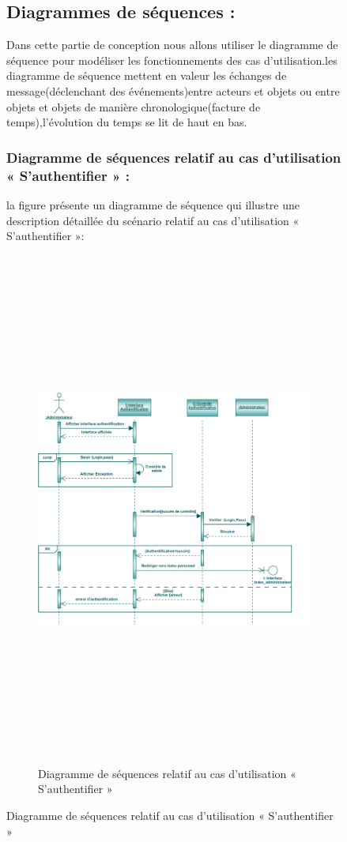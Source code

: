 \documentclass[12 pt]{report}
\begin{document}
\begin{figure}[h]
\begin{center}
\begin{figure}[h]
\begin{center}
\end{center}
\end{figure}



\subsection{Diagrammes de séquences :}
Dans cette partie de conception nous allons utiliser le diagramme de séquence pour modéliser les fonctionnements des cas d'utilisation.les diagramme de séquence mettent en valeur les échanges de message(déclenchant des événements)entre acteurs et objets ou entre objets et objets de manière chronologique(facture de temps),l'évolution du temps se lit de haut en bas.
\newpage
\subsubsection{Diagramme de séquences relatif au cas d’utilisation « S’authentifier » :}
la figure   présente un diagramme de séquence qui illustre une description détaillée du scénario relatif au cas d’utilisation « S’authentifier »: 
{\begin{figure}[h]
 \begin{center}
\includegraphics[width= 18 cm ,height=  17cm]{ca.PNG}
\caption{Diagramme de séquences relatif au cas d’utilisation « S’authentifier »}


\end{center}
\end{figure}}
\end{center}
\end{figure}
\end{document}
